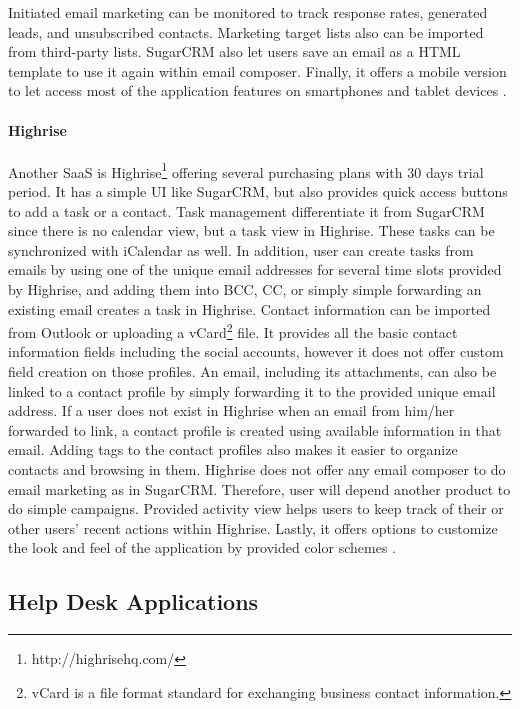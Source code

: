 Initiated email marketing can be monitored to track response rates, generated leads, and unsubscribed contacts. Marketing target lists also can be imported from third-party lists. SugarCRM also let users save an email as a \ac{HTML} template to use it again within email composer. Finally, it offers a mobile version to let access most of the application features on smartphones and tablet devices \citep{SugarCRMInc.2013}.

\paragraph{Highrise}
Another \ac{SaaS} is Highrise\footnote{http://highrisehq.com/} offering several purchasing plans with 30 days trial period. It has a simple \ac{UI} like SugarCRM, but also provides quick access buttons to add a task or a contact. Task management differentiate it from SugarCRM since there is no calendar view, but a task view in Highrise. These tasks can be synchronized with iCalendar as well. In addition, user can create tasks from emails by using one of the unique email addresses for several time slots provided by Highrise, and adding them into \ac{BCC}, \ac{CC}, or simply simple forwarding an existing email creates a task in Highrise. Contact information can be imported from Outlook or uploading a vCard\footnote{vCard is a file format standard for exchanging business contact information.} file. It provides all the basic contact information fields including the social accounts, however it does not offer custom field creation on those profiles. An email, including its attachments, can also be linked to a contact profile by simply forwarding it to the provided unique email address. If a user does not exist in Highrise when an email from him/her forwarded to link, a contact profile is created using available information in that email. Adding tags to the contact profiles also makes it easier to organize contacts and browsing in them. Highrise does not offer any email composer to do email marketing as in SugarCRM. Therefore, user will depend another product to do simple campaigns. Provided activity view helps users to keep track of their or other users' recent actions within Highrise. Lastly, it offers options to customize the look and feel of the application by provided color schemes \citep{37signals2013}.

\subsection{Help Desk Applications}
\label{subsec:3.3.2:HelpDeskAppl}

